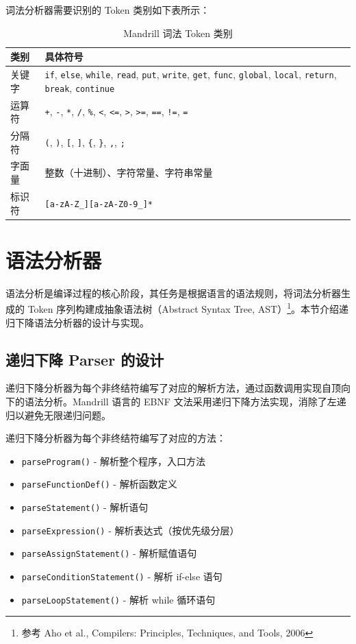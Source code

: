 \documentclass[12pt,hyperref,a4paper,UTF8]{ctexart}
\begin{document}
词法分析器需要识别的 Token 类别如下表所示：

\begin{table}[!htbp]
    \centering
    \caption{Mandrill 词法 Token 类别}
    \label{tab:tokens}
    \begin{tabular}{l|l}
    \hline
    类别 & 具体符号 \\ \hline
    关键字 & \texttt{if}, \texttt{else}, \texttt{while}, \texttt{read}, \texttt{put}, \texttt{write}, \texttt{get}, \texttt{func}, \texttt{global}, \texttt{local}, \texttt{return}, \texttt{break}, \texttt{continue} \\
    运算符 & \texttt{+}, \texttt{-}, \texttt{*}, \texttt{/}, \texttt{\%}, \texttt{<}, \texttt{<=}, \texttt{>}, \texttt{>=}, \texttt{==}, \texttt{!=}, \texttt{=} \\
    分隔符 & \texttt{(}, \texttt{)}, \texttt{[}, \texttt{]}, \texttt{\{}, \texttt{\}}, \texttt{,}, \texttt{;} \\
    字面量 & 整数（十进制）、字符常量、字符串常量 \\
    标识符 & \texttt{[a-zA-Z\_][a-zA-Z0-9\_]*} \\ \hline
    \end{tabular}
\end{table}

\section{语法分析器}

语法分析是编译过程的核心阶段，其任务是根据语言的语法规则，将词法分析器生成的 Token 序列构建成抽象语法树（Abstract Syntax Tree, AST）\footnote{参考 Aho et al., Compilers: Principles, Techniques, and Tools, 2006}。本节介绍递归下降语法分析器的设计与实现。

\subsection{递归下降 Parser 的设计}

递归下降分析器为每个非终结符编写了对应的解析方法，通过函数调用实现自顶向下的语法分析。Mandrill 语言的 EBNF 文法采用递归下降方法实现，消除了左递归以避免无限递归问题。

递归下降分析器为每个非终结符编写了对应的方法：

\begin{itemize}
    \item \texttt{parseProgram()} - 解析整个程序，入口方法
    \item \texttt{parseFunctionDef()} - 解析函数定义
    \item \texttt{parseStatement()} - 解析语句
    \item \texttt{parseExpression()} - 解析表达式（按优先级分层）
    \item \texttt{parseAssignStatement()} - 解析赋值语句
    \item \texttt{parseConditionStatement()} - 解析 if-else 语句
    \item \texttt{parseLoopStatement()} - 解析 while 循环语句
\end{itemize}
\end{document}
